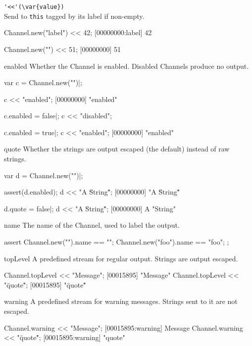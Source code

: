 \begin{urbiscriptapi}
\item \lstinline|'<<'(\var{value})|\\
  Send  to \lstinline|this| tagged by its label if non-empty.

\begin{urbiscript}
Channel.new("label") << 42;
[00000000:label] 42

Channel.new("") << 51;
[00000000] 51
\end{urbiscript}

\item[enabled] Whether the Channel is enabled.  Disabled Channels
  produce no output.
\begin{urbiscript}
var c = Channel.new("")|;

c << "enabled";
[00000000] "enabled"

c.enabled = false|;
c << "disabled";

c.enabled = true|;
c << "enabled";
[00000000] "enabled"
\end{urbiscript}

\item[quote] Whether the strings are output escaped (the default)
  instead of raw strings.
\begin{urbiscript}
var d = Channel.new("")|;

assert(d.enabled);
d << "A \"String\"";
[00000000] "A \"String\""

d.quote = false|;
d << "A \"String\"";
[00000000] A "String"
\end{urbiscript}

\item[name] The name of the Channel, used to label the output.
\begin{urbiscript}
assert
{
  Channel.new("").name == "";
  Channel.new("foo").name == "foo";
};
\end{urbiscript}


\item[topLevel] A predefined stream for regular output.  Strings are
  output escaped.
\begin{urbiscript}
Channel.topLevel << "Message";
[00015895] "Message"
Channel.topLevel << "\"quote\"";
[00015895] "\"quote\""
\end{urbiscript}

\item[warning] A predefined stream for warning messages.  Strings sent
  to it are not escaped.
\begin{urbiscript}
Channel.warning << "Message";
[00015895:warning] Message
Channel.warning << "\"quote\"";
[00015895:warning] "quote"
\end{urbiscript}
\end{urbiscriptapi}

